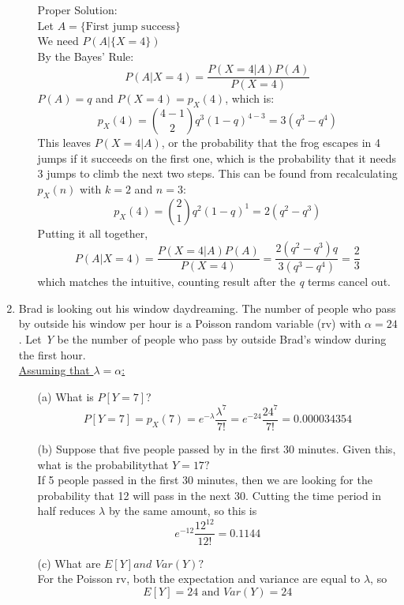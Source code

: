 \documentclass{report}
\begin{document}
\begin{enumerate}
\begin{itemize}
Proper Solution: \\
Let $ A = \{\text{First jump success}\}$ \\
We need $P(A|\{X=4\})$ \\
By the Bayes' Rule:
$$P(A|X=4) = \frac{P(X=4|A)P(A)}{P(X=4)}  $$
$P(A)=q$ and $P(X=4) = p_X(4)$, which is:
$$p_X(4) = \binom{4-1}{2}q^3(1-q)^{4-3} = 3(q^3 - q^4)$$
This leaves $P(X=4|A)$, or the probability that the frog escapes in 4 jumps if it succeeds on the first one, which is the probability that it needs 3 jumps to climb the next two steps. This can be found from recalculating $p_X(n)$ with $k=2$ and $n=3$:
$$p_X(4) = \binom{2}{1}q^2(1-q)^{1} = 2(q^2 - q^3)$$
Putting it all together,
$$P(A|X=4) = \frac{P(X=4|A)P(A)}{P(X=4)} = \frac{2(q^2 - q^3)q}{3(q^3 - q^4)} = \frac{2}{3} $$
which matches the intuitive, counting result after the \textit{q} terms cancel out.
\end{itemize}
\item Brad is looking out his window daydreaming. The number of people who pass by outside his window per hour is a Poisson random variable (rv) with
$\alpha = 24$. Let \textit{Y} be the number of people who pass by outside Brad’s window during the first hour. \\ \newline
\underline{Assuming that $\lambda = \alpha$:} \\
\begin{itemize}
\item[(a)] What is $P[Y=7]$? \\ \newline
$$ P[Y=7] = p_X(7) = e^{-\lambda}\frac{\lambda^7}{7!} = e^{-24}\frac{24^7}{7!} = 0.000034354 $$
\item[(b)] Suppose that five people passed by in the first 30 minutes.  Given this, what is the probabilitythat $Y= 17?$ \\ \newline
If 5 people passed in the first 30 minutes, then we are looking for the probability that 12 will pass in the next 30.
Cutting the time period in half reduces $\lambda$ by the same amount, so this is
$$  e^{-12}\frac{12^12}{12!} =  0.1144 $$
\item[(c)] What are $E[Y]and$ $Var(Y)?$ \\ \newline
For the Poisson rv, both the expectation and variance are equal to $\lambda$, so
$$ E[Y] = 24 \text{ and } Var(Y) = 24 $$


\end{itemize}
\end{enumerate}
\end{document}
